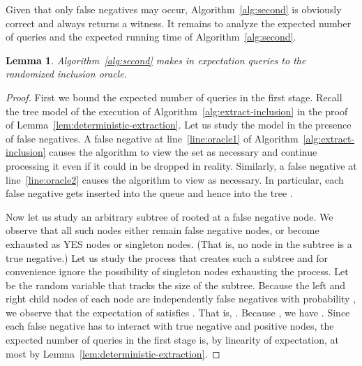 \documentclass[11pt]{article}
\newtheorem{lemma}[theorem]{Lemma}
\begin{document}
Given that only false negatives may occur, Algorithm~\ref{alg:second} is obviously correct and always returns a witness. It remains to analyze the expected number of queries and the expected running time of Algorithm~\ref{alg:second}.

\begin{lemma}
\label{thm:1se-upper-bound-query-model}
Algorithm~\ref{alg:second} makes in expectation  queries to the randomized inclusion oracle.
\end{lemma}

\begin{proof}
First we bound the expected number of queries in the first stage. 
Recall the tree model of the execution of Algorithm~\ref{alg:extract-inclusion} in the proof of Lemma~\ref{lem:deterministic-extraction}. 
Let us study the model in the presence of false negatives. 
A false negative at line~\ref{line:oracle1} of 
Algorithm~\ref{alg:extract-inclusion} causes the algorithm to view
the set  as necessary and continue processing it even if 
it could in be dropped in reality. Similarly, a false negative at 
line~\ref{line:oracle2} causes the algorithm to view  as necessary.
In particular, each false negative gets inserted into the queue 
and hence into the tree .

Now let us study an arbitrary subtree of  rooted at a false
negative node. We observe that all such nodes either remain false negative 
nodes, or become exhausted as YES nodes or singleton nodes. (That is, no
node in the subtree is a true negative.) Let us study the process that
creates such a subtree and for convenience ignore the possibility of
singleton nodes exhausting the process. Let  be the random variable 
that tracks the size of the subtree. Because the left and right child 
nodes of each node are independently false negatives with probability , 
we observe that the expectation of  satisfies 
. That is, .
Because , we have . 
Since each false negative has to interact with true negative and positive
nodes, the expected number of queries in the first stage is, by linearity of
expectation, at most  by Lemma~\ref{lem:deterministic-extraction}.


\end{proof}
\end{document}
